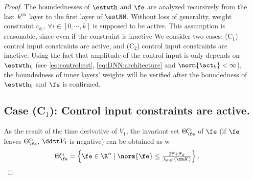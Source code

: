 \documentclass[final,5p,times,twocolumn,authoryear]{elsarticle}
\begin{document}
\begin{proof}

The boundednesses of $\estwth$ and $\fe$ are analyzed recursively from the last $k\textsuperscript{th}$ layer to the first layer of $\estNN$. 
Without loss of generality, weight constraint $c_{\theta_i},\ \forall i\in[0,\cdots,k]$ is supposed to be active.
This assumption is reasonable, since even if the constraint is inactive 
We consider two cases: (C$_1$) control input constraints are active, and (C$_2$) control input constraints are inactive.
Using the fact that amplitude of the control input is only depends on $\estwth_k$ (\ie see \eqref{eq:control:est}, \eqref{eq:DNN:architecture} and $\norm{\act_k}<\infty$), the boundedness of inner layers' weights will be verified after the boundedness of $\estwth_k$ and $\fe$ is confirmed. 

\subsection*{Case (C$_1$): Control input constraints are active.}

As the result of the time derivative of $V_1$, the invariant set $\Theta_{\fe}^{c_1}$ of $\fe$ (\ie if $\fe$ leaves $\Theta_{\fe}^{c_1}$, $\ddtt V_1$ is negative) can be obtained as w
\begin{equation}
    \Theta_{\fe}^{c_1} 
    = 
    \left\{ 
        \fe \in \R^n 
        \mid 
        \norm{\fe} 
        \le 
        \tfrac{2\overline\tau+\overline\tau_d}{\lambda_{\min}(\mm K)}
    \right\}
    .
    \label{eq:invariant:c1:fe}
\end{equation}


\end{proof}
\end{document}
